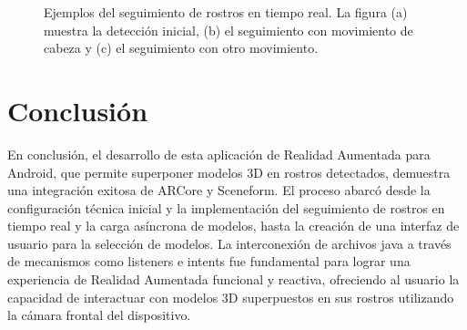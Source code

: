 \documentclass[conference]{IEEEtran}
\begin{document}
\begin{figure}[h!]
{            }\quad
            \caption{Ejemplos del seguimiento de rostros en tiempo real. La figura (a) muestra la detección inicial, (b) el seguimiento con movimiento de cabeza y (c) el seguimiento con otro movimiento.}
        \end{figure}


\section{Conclusión}

    En conclusión, el desarrollo de esta aplicación de Realidad Aumentada para Android, que permite superponer modelos 3D en rostros detectados, demuestra una integración exitosa de ARCore y Sceneform. El proceso abarcó desde la configuración técnica inicial y la implementación del seguimiento de rostros en tiempo real y la carga asíncrona de modelos, hasta la creación de una interfaz de usuario para la selección de modelos. La interconexión de archivos java a través de mecanismos como listeners e intents fue fundamental para lograr una experiencia de Realidad Aumentada funcional y reactiva, ofreciendo al usuario la capacidad de interactuar con modelos 3D superpuestos en sus rostros utilizando la cámara frontal del dispositivo.
    
\printbibliography

\end{document}
